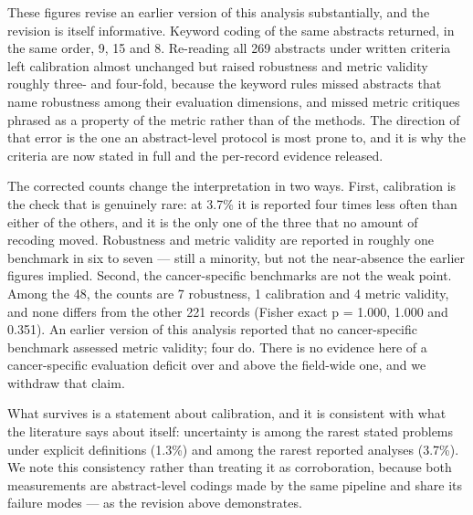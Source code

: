 \documentclass[11pt]{article}
\begin{document}
These figures revise an earlier version of this analysis substantially,
and the revision is itself informative. Keyword coding of the same
abstracts returned, in the same order, 9, 15 and 8. Re-reading all 269
abstracts under written criteria left calibration almost unchanged but
raised robustness and metric validity roughly three- and four-fold,
because the keyword rules missed abstracts that name robustness among
their evaluation dimensions, and missed metric critiques phrased as a
property of the metric rather than of the methods. The direction of that
error is the one an abstract-level protocol is most prone to, and it is
why the criteria are now stated in full and the per-record evidence
released.

The corrected counts change the interpretation in two ways. First,
calibration is the check that is genuinely rare: at 3.7\% it is reported
four times less often than either of the others, and it is the only one
of the three that no amount of recoding moved. Robustness and metric
validity are reported in roughly one benchmark in six to seven --- still
a minority, but not the near-absence the earlier figures implied.
Second, the cancer-specific benchmarks are not the weak point. Among the
48, the counts are 7 robustness, 1 calibration and 4 metric validity,
and none differs from the other 221 records (Fisher exact p = 1.000,
1.000 and 0.351). An earlier version of this analysis reported that no
cancer-specific benchmark assessed metric validity; four do. There is no
evidence here of a cancer-specific evaluation deficit over and above the
field-wide one, and we withdraw that claim.

What survives is a statement about calibration, and it is consistent
with what the literature says about itself: uncertainty is among the
rarest stated problems under explicit definitions (1.3\%) and among the
rarest reported analyses (3.7\%). We note this consistency rather than
treating it as corroboration, because both measurements are
abstract-level codings made by the same pipeline and share its failure
modes --- as the revision above demonstrates.
\end{document}

